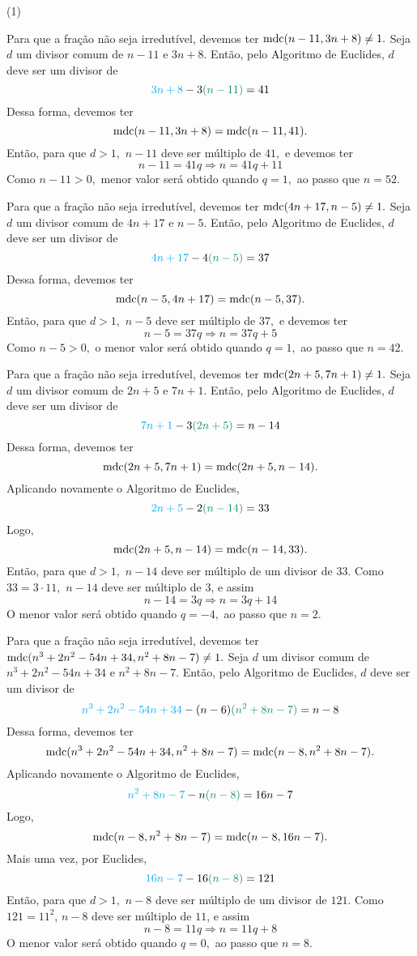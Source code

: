 \documentclass[12pt, a4paper]{article}
\newcommand{\mdc}{{\rm mdc}}
\newcommand{\negrito}[1]{\mbox{\boldmath{$#1$}}}
\newcommand{\itens}[1]{\begin{tasks}[label={(tsk[a])},label-width=3.6ex, label-format = {\bfseries}, column-sep = {0pt}](1) #1\end{tasks}}
\newcommand{\alt}[1]{\textcolor{Floresta}{$\negrito{(#1)} $}}
\begin{document}
\begin{solution}
\itens{

\task[\alt{a}] Para que a fração não seja irredutível, devemos ter $\mdc(n-11, 3n+8)  \neq 1.$ Seja $d$ um divisor comum de $n-11$ e $3n+8.$ Então, pelo Algoritmo de Euclides, $d$ deve ser um divisor de
\[
\textcolor{Cyan}{3n+8} - 3 \textcolor{PineGreen}{(n-11)} = 41
\]
Dessa forma, devemos ter
\[
\mdc(n-11,3n+8) = \mdc(n-11, 41).
\]
Então, para que $d > 1,$ $n-11$ deve ser múltiplo de $41,$ e devemos ter 
\[
n - 11 = 41q \Rightarrow n = 41q + 11
\]
Como $n - 11> 0,$ menor valor será obtido quando $q = 1,$ ao passo que $n = 52.$


\task[\alt{b}] Para que a fração não seja irredutível, devemos ter $\mdc(4n+17, n-5)  \neq 1.$ Seja $d$ um divisor comum de $4n+17$ e $n-5.$ Então, pelo Algoritmo de Euclides, $d$ deve ser um divisor de
\[
\textcolor{Cyan}{4n+17} - 4 \textcolor{PineGreen}{(n-5)} = 37
\]
Dessa forma, devemos ter
\[
\mdc(n-5,4n+17) = \mdc(n-5, 37).
\]
Então, para que $d > 1,$ $n-5$ deve ser múltiplo de $37,$ e devemos ter 
\[
n - 5 = 37q \Rightarrow n = 37q + 5
\]
Como $n - 5 >0,$ o menor valor será obtido quando $q = 1,$ ao passo que $n = 42.$

\task[\alt{c}] Para que a fração não seja irredutível, devemos ter $\mdc(2n + 5,7n+1)  \neq 1.$ Seja $d$ um divisor comum de $2n + 5$ e $7n+1.$ Então, pelo Algoritmo de Euclides, $d$ deve ser um divisor de
\[
\textcolor{Cyan}{7n+1} - 3 \textcolor{PineGreen}{(2n + 5)} = n - 14
\]
Dessa forma, devemos ter
\[
\mdc(2n + 5,7n+1) = \mdc(2n + 5, n-14).
\]
Aplicando novamente o Algoritmo de Euclides,
\[
\textcolor{Cyan}{2n+5} - 2 \textcolor{PineGreen}{(n-14)} = 33
\]
Logo, \[
\mdc(2n + 5, n-14) = \mdc(n-14,33).
\]
Então, para que $d > 1,$ $n-14$ deve ser múltiplo de um divisor de $33.$ Como $33 = 3 \cdot 11,$ $n-14$ deve ser múltiplo de $3$, e assim 
\[
n - 14 = 3q \Rightarrow n = 3q + 14
\]
O menor valor será obtido quando $q = -4,$ ao passo que $n = 2.$

\task[\alt{d}] Para que a fração não seja irredutível, devemos ter $\mdc(n^3+2n^2-54n+34, n^2 + 8n - 7)  \neq 1.$ Seja $d$ um divisor comum de $n^3+2n^2-54n+34$ e $n^2 + 8n - 7.$ Então, pelo Algoritmo de Euclides, $d$ deve ser um divisor de
\[
\textcolor{Cyan}{n^3+2n^2-54n+34} - (n-6) \textcolor{PineGreen}{(n^2 + 8n - 7)} = n-8
\]
Dessa forma, devemos ter
\[
\mdc(n^3+2n^2-54n+34,n^2 + 8n - 7) = \mdc(n-8, n^2 + 8n - 7).
\]
Aplicando novamente o Algoritmo de Euclides,
\[
\textcolor{Cyan}{n^2 + 8n - 7} - n \textcolor{PineGreen}{(n-8)} = 16n-7
\]
Logo, \[
\mdc(n-8, n^2 + 8n - 7) = \mdc(n-8,16n-7).
\]
Mais uma vez, por Euclides,
\[
\textcolor{Cyan}{16n-7} - 16 \textcolor{PineGreen}{(n-8)} = 121
\]
Então, para que $d > 1,$ $n-8$ deve ser múltiplo de um divisor de $121.$ Como $121 = 11^2$, $n-8$ deve ser múltiplo de $11$, e assim 
\[
n - 8 = 11q \Rightarrow n = 11q + 8
\]
O menor valor será obtido quando $q = 0,$ ao passo que $n = 8.$
}
\end{solution}
\end{document}
